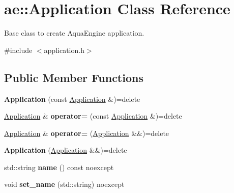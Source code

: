 \hypertarget{classae_1_1_application}{}\section{ae\+:\+:Application Class Reference}
\label{classae_1_1_application}


Base class to create Aqua\+Engine application.  




{\ttfamily \#include $<$application.\+h$>$}

\subsection*{Public Member Functions}
\begin{DoxyCompactItemize}
\item 
\hypertarget{classae_1_1_application_a7e9a30ce07057f5f37b02500f876436a}{}\label{classae_1_1_application_a7e9a30ce07057f5f37b02500f876436a} 
{\bfseries Application} (const \hyperlink{classae_1_1_application}{Application} \&)=delete
\item 
\hypertarget{classae_1_1_application_ae18f573dfd5d579e562784781f53a87a}{}\label{classae_1_1_application_ae18f573dfd5d579e562784781f53a87a} 
\hyperlink{classae_1_1_application}{Application} \& {\bfseries operator=} (const \hyperlink{classae_1_1_application}{Application} \&)=delete
\item 
\hypertarget{classae_1_1_application_ac5803ae7a946ba88cb65a110c9ae6621}{}\label{classae_1_1_application_ac5803ae7a946ba88cb65a110c9ae6621} 
\hyperlink{classae_1_1_application}{Application} \& {\bfseries operator=} (\hyperlink{classae_1_1_application}{Application} \&\&)=delete
\item 
\hypertarget{classae_1_1_application_a4c0b8e813b5596a08ecf5f69423fda99}{}\label{classae_1_1_application_a4c0b8e813b5596a08ecf5f69423fda99} 
{\bfseries Application} (\hyperlink{classae_1_1_application}{Application} \&\&)=delete
\item 
\hypertarget{classae_1_1_application_a2f4107e93f0e3c2525ad65f70a951fed}{}\label{classae_1_1_application_a2f4107e93f0e3c2525ad65f70a951fed} 
std\+::string {\bfseries name} () const noexcept
\item 
\hypertarget{classae_1_1_application_aa83e498302067740788c8e3bd9b95a62}{}\label{classae_1_1_application_aa83e498302067740788c8e3bd9b95a62} 
void {\bfseries set\+\_\+name} (std\+::string) noexcept
\item 
\hypertarget{classae_1_1_application_a7b6d08a1968612f523e6f6c3b2c7786b}{}\label{classae_1_1_application_a7b6d08a1968612f523e6f6c3b2c7786b} 

\end{DoxyCompactItemize}

